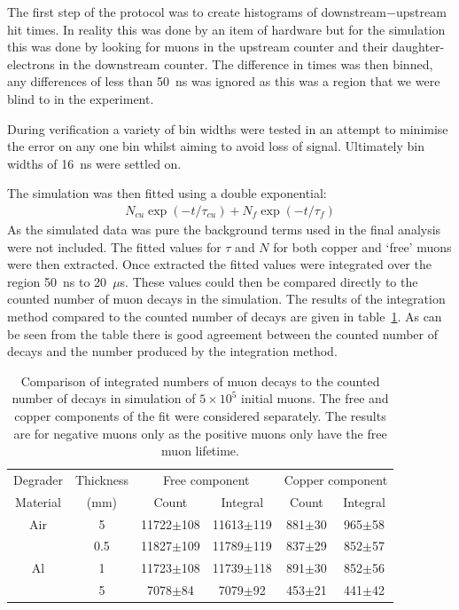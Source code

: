 The first step of the protocol was to create histograms of downstream\(-\)upstream hit times. In reality this was done by an item of hardware but for the simulation this was done by looking for muons in the upstream counter and their daughter-electrons in the downstream counter. The difference in times was then binned, any differences of less than 50~ns was ignored as this was a region that we were blind to in the experiment.

During verification a variety of bin widths were tested in an attempt to minimise the error on any one bin whilst aiming to avoid loss of signal. Ultimately bin widths of 16~ns were settled on. 

The simulation was then fitted using a double exponential: 
\begin{align}
    N_{cu}\exp(-t/\tau_{cu}) + N_{f}\exp(-t/\tau_{f})
\end{align}
As the simulated data was pure the background terms used in the final analysis were not included. The fitted values for \( \tau \) and \( N \) for both copper and `free' muons were then extracted. Once extracted the fitted values were integrated over the region 50~ns to 20~\(\mu\)s. These values could then be compared directly to the counted number of muon decays in the simulation. The results of the integration method compared to the counted number of decays are given in table~\ref{tab:sim_counts_vs_integrals}. As can be seen from the table there is good agreement between the counted number of decays and the number produced by the integration method. 
 \begin{table}
  \begin{center}
  \begin{tabular}{c | c | c | c | c | c}
    Degrader  & Thickness  &  \multicolumn{2}{c|}{Free component}    &  \multicolumn{2}{c}{Copper component}      \\ 
    Material  &    (mm)    &    Count           & Integral           &    Count        &  Integral      \\ 
    \hline
    Air       &      5     &  11722\(\pm\)108   &  11613\(\pm\)119   &  881\(\pm\)30   &     965\(\pm\)58      \\ 
    \hline
    \multirow{4}{*}{Al} 
              &    0.5     &  11827\(\pm\)109   &  11789\(\pm\)119   &  837\(\pm\)29   &     852\(\pm\)57      \\ 
              &      1     &  11723\(\pm\)108   &  11739\(\pm\)118   &  891\(\pm\)30   &     852\(\pm\)56      \\ 
              &      5     &   7078\(\pm\)84    &   7079\(\pm\)92    &  453\(\pm\)21   &      441\(\pm\)42     \\ 
    
  \end{tabular}
  \end{center}
  \caption{Comparison of integrated numbers of muon decays to the counted number of decays in simulation of \(5\times10^5\) initial muons. The free and copper components of the fit were considered separately. The results are for negative muons only as the positive muons only have the free muon lifetime.}
  \label{tab:sim_counts_vs_integrals}
\end{table}


